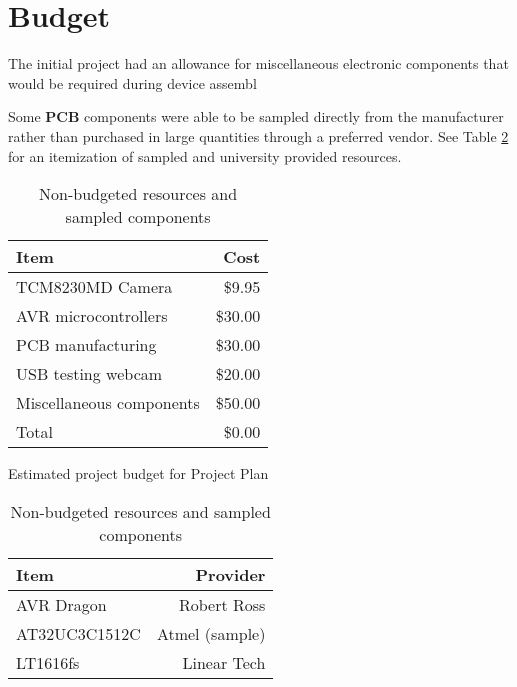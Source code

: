 \documentclass[11pt, a4paper, oneside]{Thesis} %
\begin{document}
\section{Budget}
The initial project had an allowance for miscellaneous electronic components that would be required during device assembl 

Some \textbf{PCB} components were able to be sampled directly from the manufacturer rather than purchased in large quantities through a preferred vendor. See Table \ref{tab:non_budgeted} for an itemization of sampled and university provided resources.

\begin{table}[htbp]
  \begin{minipage}[b]{0.5\linewidth}
    \centering
    \begin{tabular}{l r}
    \hline
    Item & Cost\\
    \hline
    TCM8230MD Camera & \$9.95 \\ 
    AVR microcontrollers & \$30.00 \\ 
    PCB manufacturing & \$30.00 \\
    USB testing webcam & \$20.00 \\ 
    Miscellaneous components & \$50.00 \\ 
    \hline \hline
    Total & \$0.00 \\
  \end{tabular}
  \caption{Estimated project budget for Project Plan}
  \label{tab:budget_one}
  \end{minipage}
  \hspace{0.5cm}
  \begin{minipage}[b]{0.5\linewidth}
    \centering
    \begin{tabular}{l r}
    \hline
    Item & Provider\\
    \hline
    AVR Dragon & Robert Ross \\ 
    AT32UC3C1512C & Atmel (sample) \\ 
    LT1616fs & Linear Tech \\
    \hline \hline
  \end{tabular}
  \caption{Non-budgeted resources and sampled components}
  \label{tab:non_budgeted}
  \end{minipage}
\end{table}
\end{document}
